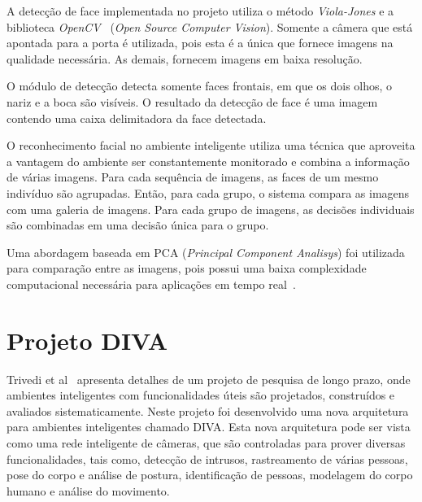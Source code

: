 A detecção de face implementada no projeto utiliza o método \textit{Viola-Jones} e a biblioteca \textit{OpenCV}~\cite{opencv_library} (\textit{Open Source Computer Vision}). Somente a câmera que está apontada para a porta é utilizada, pois esta é a única que fornece imagens na qualidade necessária. As demais, fornecem imagens em baixa resolução.  

O módulo de detecção detecta somente faces frontais, em que os dois olhos, o nariz e a boca são visíveis. O resultado da detecção de face é uma imagem contendo uma caixa delimitadora da face detectada.

O reconhecimento facial no ambiente inteligente utiliza uma técnica que aproveita a vantagem do ambiente ser constantemente monitorado e combina a informação de várias imagens. Para cada sequência de imagens, as faces de um mesmo indivíduo são agrupadas. Então, para cada grupo, o sistema compara as imagens com uma galeria de imagens. Para cada grupo de imagens, as decisões individuais são combinadas em uma decisão única para o grupo.

Uma abordagem baseada em PCA (\textit{Principal Component Analisys}) foi utilizada para comparação entre as imagens, pois possui uma baixa complexidade computacional necessária para aplicações em tempo real~\cite{salah}.


\section{Projeto DIVA}

Trivedi et al~\cite{trivedi} apresenta detalhes de um projeto de pesquisa de longo prazo, onde ambientes inteligentes com funcionalidades úteis são projetados, construídos e avaliados sistematicamente. Neste projeto foi desenvolvido uma nova arquitetura para ambientes inteligentes chamado DIVA. Esta nova arquitetura pode ser vista como uma rede inteligente de câmeras, que são controladas para prover diversas funcionalidades, tais como, detecção de intrusos, rastreamento de várias pessoas, pose do corpo e análise de postura, identificação de pessoas, modelagem do corpo humano e análise do movimento.

